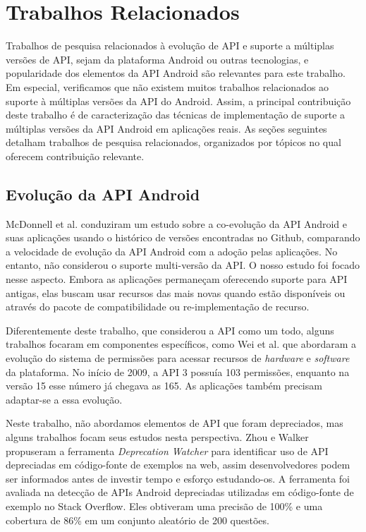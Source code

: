 \chapter{Trabalhos Relacionados} \label{ch:trabalhos-relacionados}

Trabalhos de pesquisa relacionados à evolução de API e suporte a múltiplas versões
de API, sejam da plataforma Android ou outras tecnologias, e popularidade dos
elementos da API Android são relevantes para este trabalho. Em especial, verificamos
que não existem muitos trabalhos relacionados ao suporte à múltiplas versões da API
do Android. Assim, a principal contribuição deste trabalho é de caracterização das
técnicas de implementação de suporte a múltiplas versões da API Android em aplicações
reais. As seções seguintes detalham trabalhos de pesquisa relacionados, organizados
por tópicos no qual oferecem contribuição relevante.

\section{Evolução da API Android}

McDonnell et al. \cite{McDonnell2013} conduziram um estudo sobre a co-evolução da API
Android e suas aplicações usando o histórico de versões encontradas no Github, comparando
a velocidade de evolução da API Android com a adoção pelas aplicações. No entanto, não
considerou o suporte multi-versão da API. O nosso estudo foi focado nesse aspecto. Embora
as aplicações permaneçam oferecendo suporte para API antigas, elas buscam usar recursos das
mais novas quando estão disponíveis ou através do pacote de compatibilidade ou re-implementação
de recurso.

Diferentemente deste trabalho, que considerou a API como um todo, alguns trabalhos focaram
em componentes específicos, como Wei et al.\cite{Wei2012} que abordaram a evolução do sistema
de permissões para acessar recursos de \textit{hardware} e \textit{software} da plataforma.
No início de 2009, a API 3 possuía 103 permissões, enquanto na versão 15 esse número já chegava
as 165. As aplicações também precisam adaptar-se a essa evolução. 

Neste trabalho, não abordamos elementos de API que foram depreciados, mas alguns trabalhos
focam seus estudos nesta perspectiva.  Zhou e Walker \cite{Zhou2016} propuseram a ferramenta
\textit{Deprecation Watcher} para identificar uso de API depreciadas em código-fonte de exemplos
na web, assim desenvolvedores podem ser informados antes de investir tempo e esforço estudando-os.
A ferramenta foi avaliada na detecção de APIs Android depreciadas utilizadas em código-fonte de exemplo no Stack Overflow. Eles obtiveram uma precisão de 100\% e uma cobertura de 86\% em um
conjunto aleatório de 200 questões.

